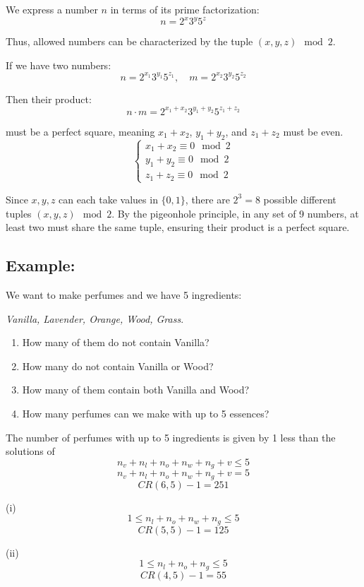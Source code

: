 \documentclass[11pt]{article}
\begin{document}
We express a number \( n \) in terms of its prime factorization:
\[
n = 2^x 3^y 5^z
\]

Thus, allowed numbers can be characterized by the tuple \( (x, y, z) \mod 2 \).

If we have two numbers:
\[
n = 2^{x_1} 3^{y_1} 5^{z_1}, \quad m = 2^{x_2} 3^{y_2} 5^{z_2}
\]

Then their product:
\[
n \cdot m = 2^{x_1 + x_2} 3^{y_1 + y_2} 5^{z_1 + z_2}
\]

must be a perfect square, meaning \( x_1 + x_2 \), \( y_1 + y_2 \), and \( z_1 + z_2 \) must be even.
\[
\begin{cases}
x_1 + x_2 \equiv 0 \mod 2 \\
y_1 + y_2 \equiv 0 \mod 2 \\
z_1 + z_2 \equiv 0 \mod 2
\end{cases}
\]

Since \( x, y, z \) can each take values in \( \{0,1\} \), there are \( 2^3 = 8 \) possible different tuples \( (x, y, z) \mod 2 \). By the pigeonhole principle, in any set of 9 numbers, at least two must share the same tuple, ensuring their product is a perfect square.

\subsection*{Example:}
We want to make perfumes and we have 5 ingredients: 

\textit{Vanilla, Lavender, Orange, Wood, Grass}.

\begin{enumerate}
    \item How many of them do not contain Vanilla?
    \item How many do not contain Vanilla or Wood?
    \item How many of them contain both Vanilla and Wood?
    \item How many perfumes can we make with up to 5 essences?
\end{enumerate}

The number of perfumes with up to 5 ingredients is given by 1 less than the solutions of 
\[
n_v + n_l + n_o + n_w + n_g + v \leq 5
\]
\[
n_v + n_l + n_o + n_w + n_g + v = 5
\]
\[
CR(6, 5) - 1 = 251
\]

(i)
\[
1 \leq n_l + n_o + n_w + n_g \leq 5
\]
\[
CR(5, 5) - 1 = 125
\]

(ii)
\[
1 \leq n_l + n_o + n_g \leq 5
\]
\[
CR(4, 5) - 1 = 55
\]
\end{document}
